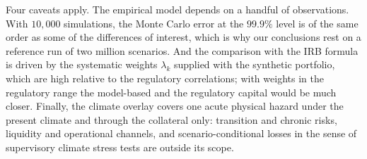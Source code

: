 Four caveats apply. The empirical model depends on a handful of observations. With $10{,}000$ simulations, the Monte Carlo error at the $99.9\%$ level is of the same order as some of the differences of interest, which is why our conclusions rest on a reference run of two million scenarios. And the comparison with the IRB formula is driven by the systematic weights $\lambda_k$ supplied with the synthetic portfolio, which are high relative to the regulatory correlations; with weights in the regulatory range the model-based and the regulatory capital would be much closer. Finally, the climate overlay covers one acute physical hazard under the present climate and through the collateral only: transition and chronic risks, liquidity and operational channels, and scenario-conditional losses in the sense of supervisory climate stress tests are outside its scope.
